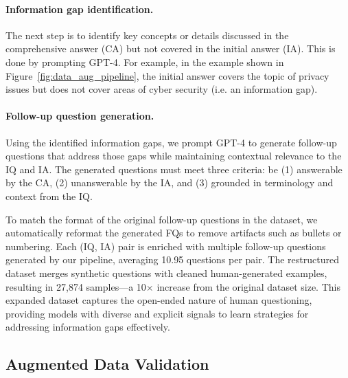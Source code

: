 \paragraph{Information gap identification.} The next step is to identify key concepts or details discussed in the comprehensive answer (CA) but not covered in the initial answer (IA). This is done by prompting GPT-4. For example, in the example shown in Figure~\ref{fig:data_aug_pipeline}, the initial answer covers the topic of privacy issues but does not cover areas of cyber security (i.e. an information gap).

\paragraph{Follow-up question generation.} Using the identified information gaps, we prompt GPT-4 to generate follow-up questions that address those gaps while maintaining contextual relevance to the IQ and IA. The generated questions must meet three criteria: be (1) answerable by the CA, (2) unanswerable by the IA, and (3) grounded in terminology and context from the IQ. %

To match the format of the original follow-up questions in the \fd{} dataset, we automatically reformat the generated FQs to remove artifacts such as bullets or numbering. Each (IQ, IA) pair is enriched with multiple follow-up questions generated by our pipeline, averaging 10.95 questions per pair. The restructured dataset merges synthetic questions with cleaned human-generated examples, resulting in 27,874 samples---a 10$\times$ increase from the original dataset size. This expanded dataset captures the open-ended nature of human questioning, providing models with diverse and explicit signals to learn strategies for addressing information gaps effectively.

\subsection{Augmented Data Validation}
\label{sec:data:quality}

